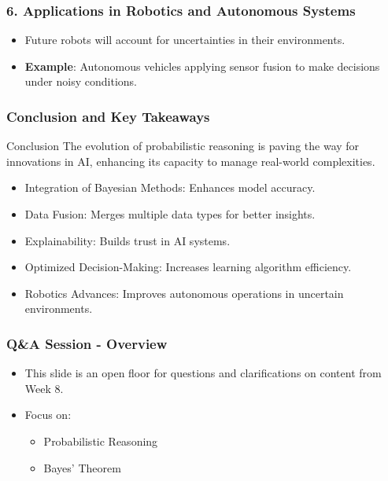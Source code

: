 \documentclass[aspectratio=169]{beamer}
\begin{document}
\begin{frame}[fragile]
    \frametitle{6. Applications in Robotics and Autonomous Systems}
    \begin{itemize}
        \item Future robots will account for uncertainties in their environments.
        \item \textbf{Example}: Autonomous vehicles applying sensor fusion to make decisions under noisy conditions.
    \end{itemize}
\end{frame}

\begin{frame}[fragile]
    \frametitle{Conclusion and Key Takeaways}
    \begin{block}{Conclusion}
        The evolution of probabilistic reasoning is paving the way for innovations in AI, enhancing its capacity to manage real-world complexities.
    \end{block}
    \begin{itemize}
        \item Integration of Bayesian Methods: Enhances model accuracy.
        \item Data Fusion: Merges multiple data types for better insights.
        \item Explainability: Builds trust in AI systems.
        \item Optimized Decision-Making: Increases learning algorithm efficiency.
        \item Robotics Advances: Improves autonomous operations in uncertain environments.
    \end{itemize}
\end{frame}

\begin{frame}[fragile]
  \frametitle{Q\&A Session - Overview}
  \begin{itemize}
    \item This slide is an open floor for questions and clarifications on content from Week 8.
    \item Focus on:
    \begin{itemize}
      \item Probabilistic Reasoning
      \item Bayes' Theorem
    \end{itemize}
  \end{itemize}
\end{frame}
\end{document}
